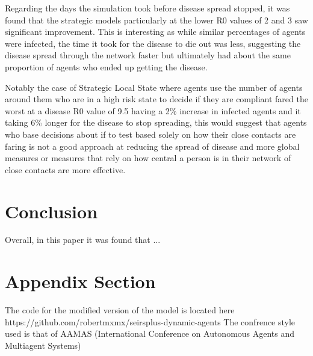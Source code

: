 \documentclass{article}
\begin{document}
Regarding the days the simulation took before disease spread stopped, it was found that the strategic models particularly at the lower R0 values of 2 and 3 saw significant improvement. This is interesting as while similar percentages of agents were infected, the time it took for the disease to die out was less, suggesting the disease spread through the network faster but ultimately had about the same proportion of agents who ended up getting the disease.

Notably the case of Strategic Local State where agents use the number of agents around them who are in a high risk state to decide if they are compliant fared the worst at a disease R0 value of 9.5 having a 2\% increase in infected agents and it taking 6\% longer for the disease to stop spreading, this would suggest that agents who base decisions about if to test based solely on how their close contacts are faring is not a good approach at reducing the spread of disease and more global measures or measures that rely on how central a person is in their network of close contacts are more effective. 


\section{Conclusion}
Overall, in this paper it was found that ...




\newpage
\appendix

\section{Appendix Section}
The code for the modified version of the model is located here https://github.com/robertmxmx/seirsplus-dynamic-agents
The confrence style used is that of AAMAS (International Conference on Autonomous Agents and Multiagent Systems) 


{}

\end{document}
